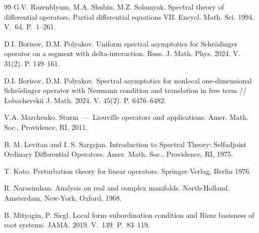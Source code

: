 \documentclass[10pt, a4paper]{article}
\theoremstyle{plain}
\theoremstyle{definition}
\numberwithin{equation}{section}
\begin{document}
\begin{thebibliography}{99}
G.V. Rozenblyum, M.A. Shubin, M.Z. Solomyak. Spectral theory of differential
operators. Partial differential equations VII. Encycl. Math. Sci. 1994. V.~64. P.~1--261.

 D.I. Borisov, D.M. Polyakov. Uniform spectral asymptotics for Schr\"odinger operator on a
 segment with delta-interaction. Russ.  J. Math. Phys. 2024. V. 31(2). P. 149--161.

D.I. Borisov, D.M. Polyakov. Spectral asymptotics for nonlocal one-dimensional Schr\"odinger operator with Neumann
condition and translation in free term // Lobachevskii J. Math. 2024. V. 45(2). P. 6476--6482.

V.A. Marchenko. Sturm~---~Liouville operators and applications. Amer. Math. Soc.,
Providence, RI, 2011.

 B. M. Levitan and I. S. Sargsjan. Introduction to Spectral Theory: Selfadjoint Ordinary Differential
Operators. Amer. Math. Soc., Providence, RI, 1975.

T. Kato. Perturbation theory for linear operators. Springer-Verlag, Berlin 1976.

R. Narasimhan. Analysis on real and complex manifolds. North-Holland. Amsterdam, New-York, Oxford, 1968.

B. Mityagin, P. Siegl. Local form--subordination condition and Riesz basisness of root systems.
JAMA. 2019. V.~139. P.~83--119.
\end{thebibliography}
\end{document}
